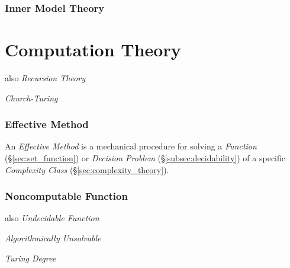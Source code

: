 \documentclass{article}
\begin{document}
\section{Inner Model Theory}\label{sec:inner_model_theory}



\part{Computation Theory}\cite{czoo14}\label{sec:recursion_theory}

also \emph{Recursion Theory}

\emph{Church-Turing}



\section{Effective Method}\label{sec:effective_method}

An \emph{Effective Method} is a mechanical procedure for solving a
\emph{Function} (\S\ref{sec:set_function}) or \emph{Decision Problem}
(\S\ref{subsec:decidability}) of a specific \emph{Complexity Class}
(\S\ref{sec:complexity_theory}).



\section{Noncomputable Function}\label{sec:noncomputable_function}

also \emph{Undecidable Function}

\emph{Algorithmically Unsolvable}

\emph{Turing Degree}



\end{document}
